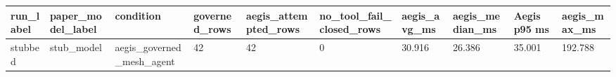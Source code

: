 \begin{tabular}{llllllllll}
 \hline
run\_label & paper\_model\_label & condition & governed\_rows & aegis\_attempted\_rows & no\_tool\_fail\_closed\_rows & aegis\_avg\_ms & aegis\_median\_ms & Aegis p95 ms & aegis\_max\_ms \\
 \hline
stubbed & stub\_model & aegis\_governed\_mesh\_agent & 42 & 42 & 0 & 30.916 & 26.386 & 35.001 & 192.788 \\
 \hline
\end{tabular}
